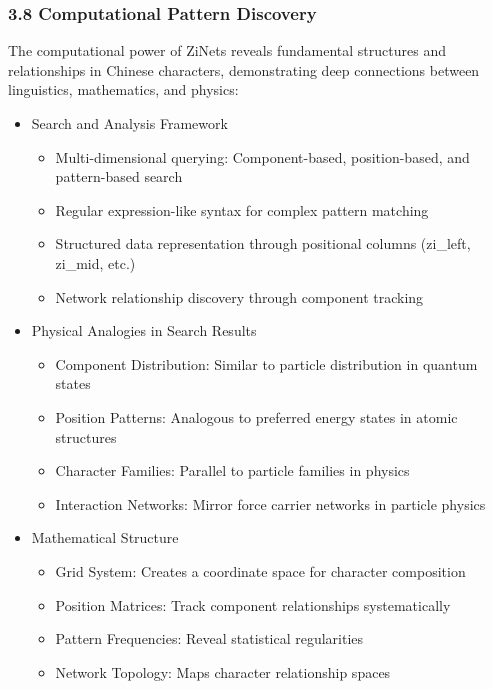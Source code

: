 \documentclass[
]{article}
\providecommand{\tightlist}{%
  \setlength{\itemsep}{0pt}\setlength{\parskip}{0pt}}
\begin{document}
\subsubsection{3.8 Computational Pattern
Discovery}\label{computational-pattern-discovery}

The computational power of ZiNets reveals fundamental structures and
relationships in Chinese characters, demonstrating deep connections
between linguistics, mathematics, and physics:

\begin{itemize}
\tightlist
\item
  Search and Analysis Framework

  \begin{itemize}
  \tightlist
  \item
    Multi-dimensional querying: Component-based, position-based, and
    pattern-based search
  \item
    Regular expression-like syntax for complex pattern matching
  \item
    Structured data representation through positional columns (zi\_left,
    zi\_mid, etc.)
  \item
    Network relationship discovery through component tracking
  \end{itemize}
\item
  Physical Analogies in Search Results

  \begin{itemize}
  \tightlist
  \item
    Component Distribution: Similar to particle distribution in quantum
    states
  \item
    Position Patterns: Analogous to preferred energy states in atomic
    structures
  \item
    Character Families: Parallel to particle families in physics
  \item
    Interaction Networks: Mirror force carrier networks in particle
    physics
  \end{itemize}
\item
  Mathematical Structure

  \begin{itemize}
  \tightlist
  \item
    Grid System: Creates a coordinate space for character composition
  \item
    Position Matrices: Track component relationships systematically
  \item
    Pattern Frequencies: Reveal statistical regularities
  \item
    Network Topology: Maps character relationship spaces
  \end{itemize}
\end{itemize}
\end{document}
